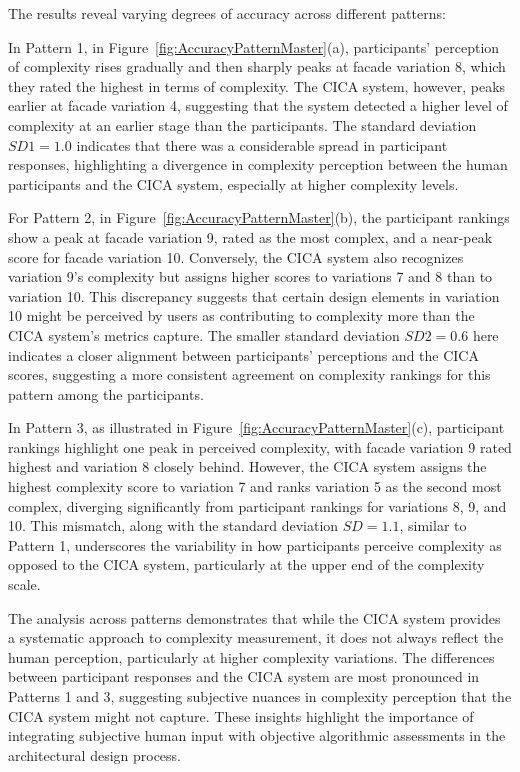 The results reveal varying degrees of accuracy across different patterns:

In Pattern 1, in Figure~\ref{fig:AccuracyPatternMaster}(a), participants' perception of complexity rises gradually and then sharply peaks at facade variation 8, which they rated the highest in terms of complexity.
The CICA system, however, peaks earlier at facade variation 4, suggesting that the system detected a higher level of complexity at an earlier stage than the participants.
The standard deviation \(SD1 = 1.0\) indicates that there was a considerable spread in participant responses, highlighting a divergence in complexity perception between the human participants and the CICA system, especially at higher complexity levels.

For Pattern 2, in Figure~\ref{fig:AccuracyPatternMaster}(b), the participant rankings show a peak at facade variation 9, rated as the most complex, and a near-peak score for facade variation 10.
Conversely, the CICA system also recognizes variation 9's complexity but assigns higher scores to variations 7 and 8 than to variation 10.
This discrepancy suggests that certain design elements in variation 10 might be perceived by users as contributing to complexity more than the CICA system's metrics capture.
The smaller standard deviation \(SD2 = 0.6\) here indicates a closer alignment between participants’ perceptions and the CICA scores, suggesting a more consistent agreement on complexity rankings for this pattern among the participants.

In Pattern 3, as illustrated in Figure~\ref{fig:AccuracyPatternMaster}(c), participant rankings highlight one peak in perceived complexity, with facade variation 9 rated highest and variation 8 closely behind.
However, the CICA system assigns the highest complexity score to variation 7 and ranks variation 5 as the second most complex, diverging significantly from participant rankings for variations 8, 9, and 10.
This mismatch, along with the standard deviation \(SD = 1.1\), similar to Pattern 1, underscores the variability in how participants perceive complexity as opposed to the CICA system, particularly at the upper end of the complexity scale.

The analysis across patterns demonstrates that while the CICA system provides a systematic approach to complexity measurement, it does not always reflect the human perception, particularly at higher complexity variations.
The differences between participant responses and the CICA system are most pronounced in Patterns 1 and 3, suggesting subjective nuances in complexity perception that the CICA system might not capture.
These insights highlight the importance of integrating subjective human input with objective algorithmic assessments in the architectural design process.



